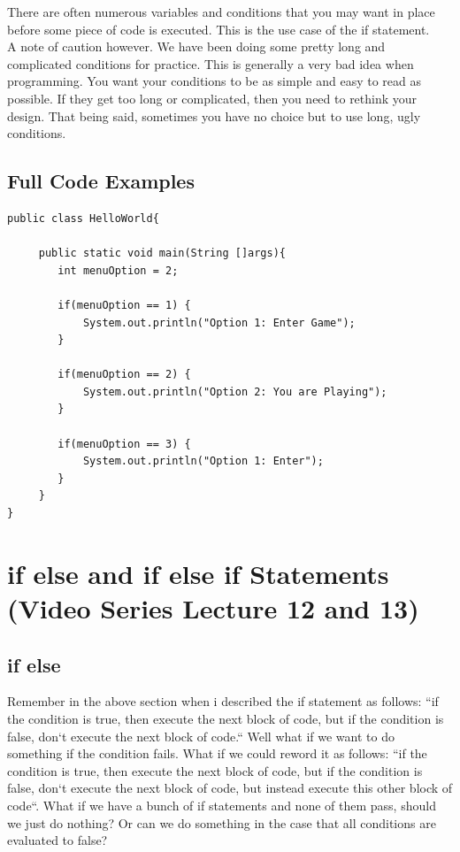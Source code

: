 \documentclass[11]{article}
\begin{document}
There are often numerous variables and conditions that you may want in place before some piece of code is executed. This is the use case of the if statement.\\

A note of caution however. We have been doing some pretty long and complicated conditions for practice. This is generally a very bad idea when programming. You want your conditions to be as simple and easy to read as possible. If they get too long or complicated, then you need to rethink your design. That being said, sometimes you have no choice but to use long, ugly conditions.
\subsection{Full Code Examples}
\begin{lstlisting}
public class HelloWorld{

     public static void main(String []args){
        int menuOption = 2;
         
        if(menuOption == 1) {
            System.out.println("Option 1: Enter Game");
        }
        
        if(menuOption == 2) {
            System.out.println("Option 2: You are Playing");
        }
        
        if(menuOption == 3) {
            System.out.println("Option 1: Enter");
        }        
     }
}
\end{lstlisting}

\section{if else and if else if Statements (Video Series Lecture 12 and 13)}
\subsection{if else}
Remember in the above section when i described the if statement as follows: ``if the condition is true, then execute the next block of code, but if the condition is false, don`t execute the next block of code.`` Well what if we want to do something if the condition fails. What if we could reword it as follows: ``if the condition is true, then execute the next block of code, but if the condition is false, don`t execute the next block of code, but instead execute this other block of code``. What if we have a bunch of if statements and none of them pass, should we just do nothing? Or can we do something in the case that all conditions are evaluated to false?\\
\end{document}
